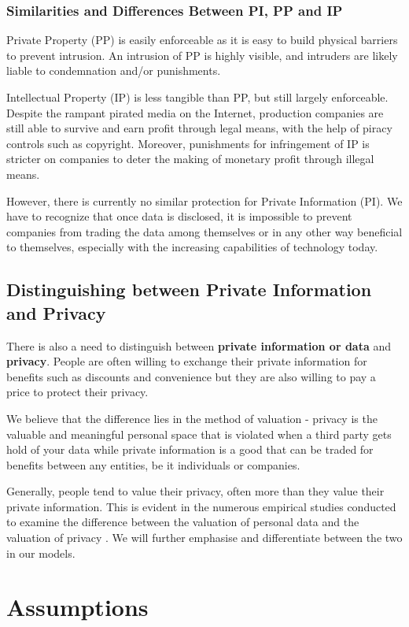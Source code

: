 \documentclass{icmmcm}
\begin{document}
\subsubsection*{Similarities and Differences Between PI, PP and IP}
Private Property (PP) is easily enforceable as it is easy to build physical barriers to prevent intrusion. An intrusion of PP is highly visible, and intruders are likely liable to condemnation and/or punishments.

Intellectual Property (IP) is less tangible than PP, but still largely enforceable. Despite the rampant pirated media on the Internet, production companies are still able to survive and earn profit through legal means, with the help of piracy controls such as copyright. Moreover, punishments for infringement of IP is stricter on companies to deter the making of monetary profit through illegal means.

However, there is currently no similar protection for Private Information (PI). We have to recognize that once data is disclosed, it is impossible to prevent companies from trading the data among themselves or in any other way beneficial to themselves, especially with the increasing capabilities of technology today.

\subsection{Distinguishing between Private Information and Privacy}
There is also a need to distinguish between \textbf{private information or data} and \textbf{privacy}. People are often willing to exchange their private information for benefits such as discounts and convenience but they are also willing to pay a price to protect their privacy. \citep{OCED}

We believe that the difference lies in the method of valuation - privacy is the valuable and meaningful personal space that is violated when a third party gets hold of your data while private information is a good that can be traded for benefits between any entities, be it individuals or companies.

Generally, people tend to value their privacy, often more than they value their private information. This is evident in the numerous empirical studies conducted to examine the difference between the valuation of personal data and the valuation of privacy \citep{OCED}. We will further emphasise and differentiate between the two in our models.

\section{Assumptions}
\end{document}

